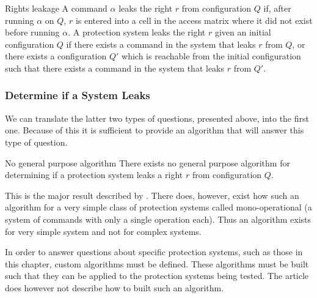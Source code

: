 \begin{definition}{Rights leakage}
A command $\alpha$ leaks the right $r$ from configuration $Q$ if, after running $\alpha$ on $Q$, $r$ is entered into a cell in the access matrix where it did not exist before running $\alpha$.
A protection system leaks the right $r$ given an initial configuration $Q$ if there exists a command in the system that leaks $r$ from $Q$, or there exists a configuration $Q'$ which is reachable from the initial configuration such that there exists a command in the system that leaks $r$ from $Q'$.
\end{definition}

\subsubsection{Determine if a System Leaks}
We can translate the latter two types of questions, presented above, into the first one.
Because of this it is sufficient to provide an algorithm that will answer this type of question.

\begin{definition}{No general purpose algorithm}
  There exists no general purpose algorithm for determining if a protection system leaks a right $r$ from configuration $Q$. \Cite{HRU}
\end{definition}

This is the major result described by \citet{HRU}.
There does, however, exist how such an algorithm for a very simple class of protection systems called mono-operational (a system of commands with only a single operation each).
Thus an algorithm exists for very simple system and not for complex systems.

In order to answer questions about specific protection systems, such as those in this chapter, custom algorithms must be defined.
These algorithms must be built such that they can be applied to the protection systems being tested.
The article does however not describe how to built such an algorithm.
